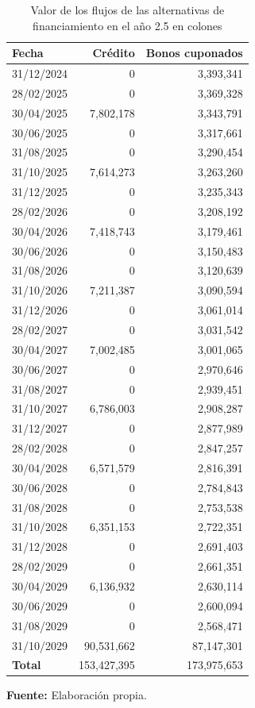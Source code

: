 \documentclass[12pt]{article}
\begin{document}
\begin{table}[H]
\centering
\caption{Valor de los flujos de las alternativas de financiamiento en el año 2.5 en colones}
\begin{threeparttable}
\vspace{0.1cm}
\begin{tabular}{lrr}
\hline\hline
\textbf{Fecha} & \textbf{Crédito} & \textbf{Bonos cuponados} \\ \hline
31/12/2024 & 0 &  3,393,341 \\
28/02/2025 & 0 &  3,369,328 \\
30/04/2025 & 7,802,178 & 3,343,791 \\
30/06/2025 & 0 & 3,317,661 \\
31/08/2025 & 0 & 3,290,454 \\
31/10/2025 & 7,614,273 & 3,263,260 \\
31/12/2025 & 0 & 3,235,343 \\
28/02/2026 & 0 & 3,208,192 \\
30/04/2026 & 7,418,743 & 3,179,461 \\
30/06/2026 & 0 & 3,150,483 \\
31/08/2026 & 0 & 3,120,639 \\
31/10/2026 & 7,211,387 & 3,090,594 \\
31/12/2026 & 0 & 3,061,014 \\
28/02/2027 & 0 & 3,031,542 \\
30/04/2027 & 7,002,485 & 3,001,065 \\
30/06/2027 & 0 & 2,970,646 \\
31/08/2027 & 0 & 2,939,451 \\
31/10/2027 & 6,786,003 & 2,908,287 \\
31/12/2027 & 0 & 2,877,989 \\
28/02/2028 & 0 & 2,847,257 \\
30/04/2028 & 6,571,579 & 2,816,391 \\
30/06/2028 & 0 & 2,784,843 \\
31/08/2028 & 0 & 2,753,538 \\
31/10/2028 & 6,351,153 & 2,722,351 \\
31/12/2028 & 0 & 2,691,403 \\
28/02/2029 & 0 & 2,661,351 \\
30/04/2029 & 6,136,932 & 2,630,114 \\
30/06/2029 & 0 & 2,600,094 \\
31/08/2029 & 0 & 2,568,471 \\
31/10/2029 & 90,531,662 & 87,147,301 \\ \hline 
\textbf{Total} & 153,427,395 & 173,975,653 \\ \hline \hline 
\end{tabular}
 \begin{tablenotes}
	\item[] \small\textbf{Fuente:} Elaboración propia.
\end{tablenotes} 
\end{threeparttable}
\label{tabla1c}
 \end{table}
\end{document}
